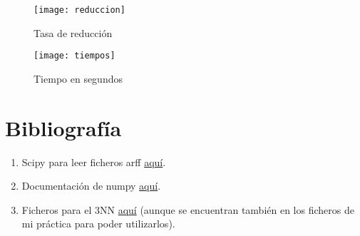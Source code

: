\documentclass[12pt]{article}
\begin{document}
\begin{figure}[H]
\centering
\texttt{[image: reduccion]}
\caption{Tasa de reducción} \label{fig:reduccion}
\end{figure}

\begin{figure}[H]
\centering
\texttt{[image: tiempos]}
\caption{Tiempo en segundos} \label{fig:tiempos}
\end{figure}


\section{Bibliografía}
\begin{enumerate}
\item Scipy para leer ficheros arff \href{arff http://docs.scipy.org/doc/scipy/reference/generated/scipy.io.arff.loadarff.html}{aquí}.
\item Documentación de numpy \href{http://docs.scipy.org/doc/numpy/user/index.html}{aquí}.
\item Ficheros para el 3NN \href{https://github.com/agarciamontoro/metaheuristics/tree/master/src/knnGPU}{aquí} (aunque se encuentran también en los ficheros de mi práctica para poder utilizarlos).
\end{enumerate}
\end{document}

